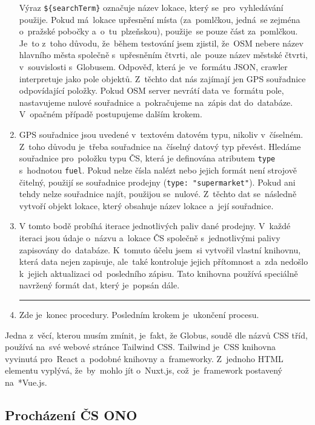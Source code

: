 \begin{enumerate}
        Výraz \texttt{\$\{searchTerm\}} označuje název lokace, který
        se~pro~vyhledávání použije. Pokud má~lokace upřesnění místa
        (za~pomlčkou, jedná~se zejména o~pražské pobočky a~o~tu~plzeňskou),
        použije~se pouze část za~pomlčkou. Je~to z~toho důvodu, že~během
        testování jsem zjistil, že~OSM nebere název hlavního města společně
        s~upřesněním čtvrti, ale~pouze název městské čtvrti, v~souvislosti
        s~Globusem. Odpověď, která je~ve~formátu JSON, crawler interpretuje
        jako pole objektů. Z~těchto dat nás zajímají jen GPS souřadnice
        odpovídající položky. Pokud OSM server nevrátí data ve~formátu pole,
        nastavujeme nulové souřadnice a~pokračujeme na~zápis dat do~databáze.
        V~opačném případě postupujeme dalším krokem.
    \item GPS souřadnice jsou uvedené v~textovém datovém typu, nikoliv
        v~číselném. Z~toho důvodu je~třeba souřadnice na~číselný datový typ
        převést. Hledáme souřadnice pro~položku typu ČS, která je definována
        atributem \texttt{type} s~hodnotou \texttt{fuel}. Pokud nelze čísla
        nalézt nebo jejich formát není strojově čitelný, použijí se
        souřadnice prodejny (\texttt{type: "supermarket"}). Pokud ani tehdy
        nelze souřadnice najít, použijou se~nulové. Z~těchto dat se~následně
        vytvoří objekt lokace, který obsahuje název lokace a~její souřadnice.
    \item V tomto bodě probíhá iterace jednotlivých paliv dané prodejny.
        V~každé iteraci jsou údaje o~názvu a~lokace ČS společně
        s~jednotlivými palivy zapisovány do~databáze. K~tomuto účelu jsem~si
        vytvořil vlastní knihovnu, která data nejen zapisuje, ale~také
        kontroluje jejich přítomnost a~zda nedošlo k~jejich aktualizaci
        od~posledního zápisu. Tato knihovna používá speciálně navržený formát
        dat, který je~popsán dále.
        \hrule
    \item Zde je~konec procedury. Posledním krokem je~ukončení procesu.
\end{enumerate}

Jedna z~věcí, kterou musím zmínit, je~fakt, že Globus, soudě dle názvů CSS
tříd, používá na~své webové stránce Tailwind CSS. Tailwind je~CSS knihovna
vyvinutá pro~React a~podobné knihovny a~frameworky. Z~jednoho HTML elementu
vyplývá, že~by~mohlo jít o~Nuxt.js, což~je~framework postavený na~*Vue.js.

\subsection{Procházení ČS ONO}
\label{sec:crawling-ono}

